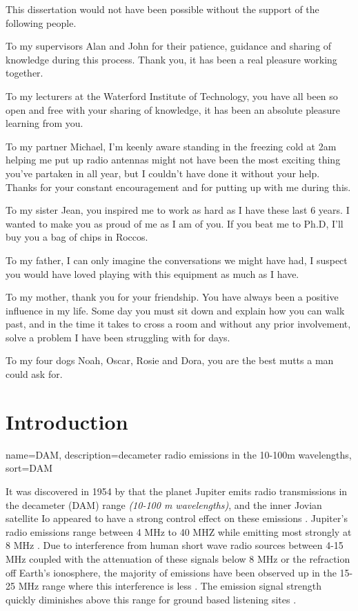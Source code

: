 \documentclass[runningheads,a4paper]{llncs}
\begin{document}
This dissertation would not have been possible without the support of the following people.

To my supervisors Alan and John for their patience, guidance and sharing of knowledge during this process. Thank you, it has been a real pleasure working together.

To my lecturers at the Waterford Institute of Technology, you have all been so open and free with your sharing of knowledge, it has been an absolute pleasure learning from you.

To my partner Michael, I'm keenly aware standing in the freezing cold at 2am helping me put up radio antennas might not have been the most exciting thing you've partaken in all year, but I couldn't have done it without your help. Thanks for your constant encouragement and for putting up with me during this. 

To my sister Jean, you inspired me to work as hard as I have these last 6 years. I wanted to make you as proud of me as I am of you. If you beat me to Ph.D, I'll buy you a bag of chips in Roccos.

To my father, I can only imagine the conversations we might have had, I suspect you would have loved playing with this equipment as much as I have.

To my mother, thank you for your friendship. You have always been a positive influence in my life. Some day you must sit down and explain how you can walk past, and in the time it takes to cross a room and without any prior involvement, solve a problem I have been struggling with for days.

To my four dogs Noah, Oscar, Rosie and Dora, you are the best mutts a man could ask for.

%
\renewcommand*{\glsclearpage}{}
\printglossaries
%
\newpage
\tableofcontents
\newpage
\listoftables
{}
%
\newpage
\chapter*{Introduction}

%
{
  name={DAM},
  description={decameter radio emissions in the 10-100m wavelengths},
  sort=DAM
}
%

It was discovered in 1954 by \cite{burke55} that the planet Jupiter emits radio transmissions in the decameter (\gls{DAM}) range \textit{(10-100 m wavelengths)}, and the inner Jovian satellite Io appeared to have a strong control effect on these emissions \citep{belcher87}. Jupiter's radio emissions range between 4 MHz to 40 MHZ while emitting most strongly at 8 MHz  \citep{wilkinson94}. Due to interference from human short wave radio sources between 4-15 MHz coupled with the attenuation of these signals below 8 MHz or the refraction off Earth's ionosphere, the majority of emissions have been observed up in the 15-25 MHz range where this interference is less \citep{wilkinson94}. The emission signal strength quickly diminishes above this range for ground based listening sites \citep{wilkinson94}.
\end{document}
